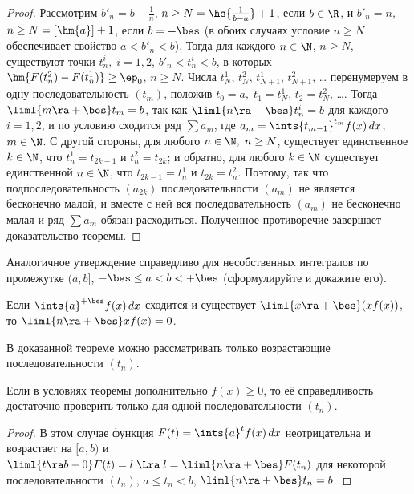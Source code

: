 \documentclass[a4paper]{article}
\begin{document}
\begin{proof}
Рассмотрим $b'_n = b-\frac1n$, $n\ge N = \hs{\frac1{b-a}}+1$, если
$b\in\R$, и $b'_n=n$, $n\ge N = [\hm{a}]+1$, если $b=+\bes$ (в обоих
случаях условие $n\ge N$ обеспечивает свойство $a<b'_n<b$). Тогда
для каждого $n\in\N$, $n\ge N$, существуют точки $t^i_n, \; i=1,2$,
$b'_n<t_n^i<b$, в которых $\hm{F(t_n^2) - F(t_n^1)}\ge\ep_0$, $n\ge
N$. Числа $t^1_N$, $t^2_N$, $t^1_{N+1}$, $t^2_{N+1}$, \ldots
перенумеруем в одну последовательность $(t_m)$, положив $t_0=a, \;
t_1=t^1_N$, $t_2=t^2_N$, \ldots. Тогда $\liml{m\ra+\bes} t_m=b$, так
как $\liml{n\ra+\bes} t^i_n=b$ для каждого $i=1,2$, и по условию
сходится ряд $\sum a_m$, где $a_m = \ints{t_{m-1}}^{t_m} f(x)\,dx$,
$m\in\N$. С другой стороны, для любого $n\in\N, \; n\ge N$,
существует единственное $k\in\N$, что $t_n^1 = t_{2k-1}$ и $t^2_n =
t_{2k}$; и обратно, для любого $k\in\N$ существует единственной
$n\in\N$, что $t_{2k-1}=t^1_n$ и $t_{2k}=t^2_n$. Поэтому,  так что
подпоследовательность $(a_{2k})$ последовательности $(a_m)$ не
является бесконечно малой, и вместе с ней вся последовательность
$(a_m)$ не бесконечно малая и ряд $\sum a_m$ обязан расходиться.
Полученное противоречие завершает доказательство теоремы.
\end{proof}

Аналогичное утверждение справедливо для несобственных интегралов по
промежутке $(a,b]$, $-\bes\le a < b < +\bes$ (сформулируйте и
докажите его).

\begin{tproblem}
Если $\ints{a}^{+\bes} f(x)\,dx$ сходится и существует
$\liml{x\ra+\bes} (xf(x))$, то $\liml{n\ra+\bes} xf(x)=0$.
\end{tproblem}

\begin{note}
В доказанной теореме можно рассматривать только возрастающие
последовательности $(t_n)$.
\end{note}

\begin{note}
Если в условиях теоремы дополнительно $f(x)\ge 0$, то её
справедливость достаточно проверить только для одной
последовательности $(t_n)$.
\end{note}

\begin{proof}
В этом случае функция $F(t) = \ints{a}^t f(x)\,dx$ неотрицательна и
возрастает на $[a,b)$ и $\liml{t\ra b-0} F(t)=l \; \Lra \; l =
\liml{n\ra+\bes} F(t_n)$ для некоторой последовательности $(t_n)$,
$a\le t_n < b$, $\liml{n\ra+\bes} t_n=b$.
\end{proof}
\end{document}
